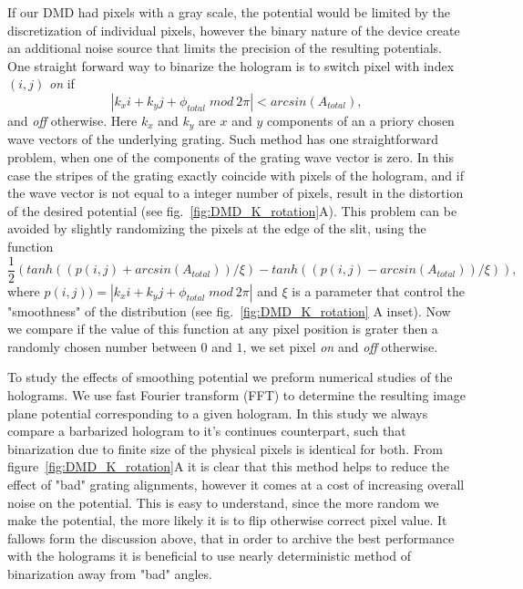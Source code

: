 If our DMD had pixels with a gray scale, the potential would be limited by the discretization of individual pixels, however the binary nature of the device create an additional noise source that limits the precision of the resulting potentials. One straight forward way to binarize the hologram is to switch pixel with index $(i,j)$ \textit{on} if 
\begin{equation}
\left| k_x i + k_y j + \phi_{total} \; mod \: 2 \pi \right| < arcsin(A_{total}),
\end{equation}
and \textit{off} otherwise. Here $k_x$ and $k_y$ are $x$ and $y$ components of an a priory chosen wave vectors of the underlying grating. Such method has one straightforward problem, when one of the components of the grating wave vector is zero. In this case the stripes of the grating exactly coincide with pixels of the hologram, and if the wave vector is not equal to a integer number of pixels, result in the distortion of the desired potential (see fig.~\ref{fig:DMD_K_rotation}A). This problem can be avoided by slightly randomizing the pixels at the edge of the slit, using the function 
\begin{equation}
\frac{1}{2}(tanh((p(i,j) + arcsin(A_{total}))/\xi) - tanh((p(i,j) - arcsin(A_{total}))/\xi)),
\end{equation}
where $p(i,j))=\left| k_x i + k_y j + \phi_{total} \; mod \: 2 \pi \right|$ and $\xi$ is a parameter that control the "smoothness" of the distribution (see fig.~\ref{fig:DMD_K_rotation} A inset). Now we compare if the value of this function at any pixel position is grater then a randomly chosen number between $0$ and $1$, we set pixel \textit{on} and \textit{off} otherwise. 

To study the effects of smoothing potential we preform numerical studies of the holograms. We use fast Fourier transform (FFT) to determine the resulting image plane potential corresponding to a given hologram. In this study we always compare a barbarized hologram to it's continues counterpart, such that binarization due to finite size of the physical pixels is identical for both. From figure~\ref{fig:DMD_K_rotation}A it is clear that this method helps to reduce the effect of "bad" grating alignments, however it comes at a cost of increasing overall noise on the potential. This is easy to understand, since the more random we make the potential, the more likely it is to flip otherwise correct pixel value. It fallows form the discussion above, that in order to archive the best performance with the holograms it is beneficial to use nearly deterministic method of binarization away from "bad" angles. 

